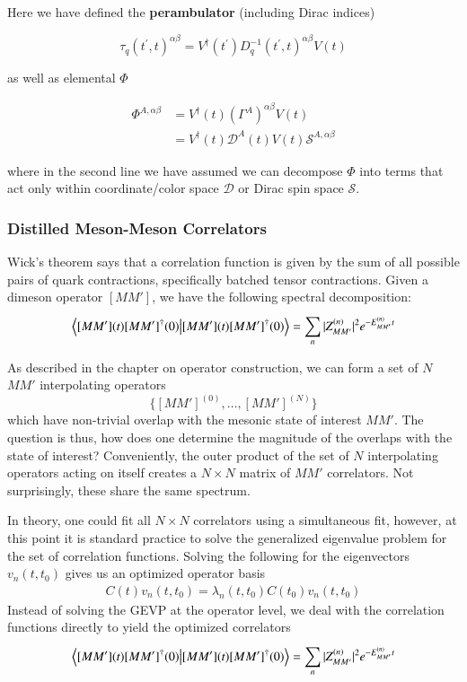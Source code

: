 Here we have defined the \textbf{perambulator} (including Dirac indices)

\begin{equation}
\tau_q(t^\prime, t)^{\alpha \beta} = V^\dagger(t^\prime) D^{-1}_q(t^\prime, t)^{\alpha \beta} V(t)
\end{equation}

as well as elemental $\Phi$
    
\begin{align}
\Phi^{A, \alpha\beta} 
&= V^\dagger(t) (\Gamma^A)^{\alpha \beta} V(t) \\
&= V^\dagger(t) \mathcal D^A(t)V(t) \mathcal S^{A, \alpha \beta}
\end{align}

where in the second line we have assumed we can decompose \(\Phi\) into terms that act only within coordinate/color space \(\mathcal{D}\) or Dirac spin space \(\mathcal{S}\).

\subsubsection{Distilled Meson-Meson Correlators}
Wick's theorem says that a correlation function is given by the sum of all possible pairs of quark contractions, specifically batched tensor contractions. Given a dimeson operator $[MM']$, we have the following spectral decomposition: 
\begin{align}
    \braket{[MM'](t) [MM']^\dagger(0)} = \sum_{n}^{} |Z_{MM'}^{(n)}|^2 e^{-E_{MM'}^{(n)}t}
\end{align}

As described in the chapter on operator construction, we can form a set of $N$ $MM'$ interpolating operators $$\{[MM']^{(0)},\dots,[MM']^{(N)}\}$$ which have non-trivial overlap with the mesonic state of interest $MM'$. The question is thus, how does one determine the magnitude of the overlaps with the state of interest? Conveniently, the outer product of the set of $N$ interpolating operators acting on itself creates a $N \times N$ matrix of $MM'$ correlators. Not surprisingly, these share the same spectrum. 

In theory, one could fit all $N \times N$ correlators using a simultaneous fit, however, at this point it is standard practice to solve the generalized eigenvalue problem for the set of correlation functions. Solving the following for the eigenvectors $v_n(t,t_0)$ gives us an optimized operator basis
\begin{align}
    C(t)v_n(t,t_0) = \lambda_n(t,t_0)C(t_0)v_n(t,t_0)
\end{align}
Instead of solving the GEVP at the operator level, we deal with the correlation functions directly to yield the optimized correlators 
\begin{align}
    \braket{[MM'](t) [MM']^\dagger(0)} = \sum_{n}^{} |Z_{MM'}^{(n)}|^2 e^{-E_{MM'}^{(n)}t} 
\end{align}

